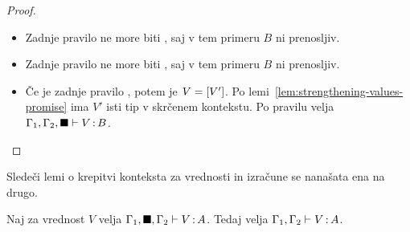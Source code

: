 \begin{proof}
\begin{itemize}
		\item Zadnje pravilo ne more biti , saj v tem primeru $B$ ni prenosljiv.
		
		\item Zadnje pravilo ne more biti , saj v tem primeru $B$ ni prenosljiv.
		
		\item Če je zadnje pravilo , potem je $V = [V']$.
		Po lemi~\ref{lem:strengthening-values-promise} ima $V'$ isti tip v skrčenem kontekstu.
		Po pravilu  velja $\Gamma_1, \Gamma_2, \blacksquare \vdash V \mathinner{:} B$.
		
	\end{itemize}
\end{proof}

Sledeči lemi o krepitvi konteksta za vrednosti in izračune se nanašata ena na drugo.

\begin{lema}\label{lem:strengthening-values-bb}
	Naj za vrednost $V$ velja $\Gamma_1, \blacksquare, \Gamma_2 \vdash V \mathinner{:} A$. Tedaj velja $\Gamma_1, \Gamma_2 \vdash V \mathinner{:} A$.
\end{lema}


